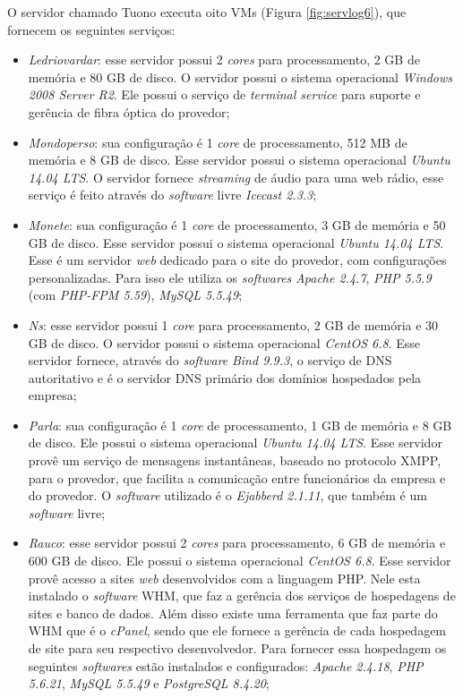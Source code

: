 O servidor chamado Tuono executa oito \ac{VM}s (Figura \ref{fig:servlog6}), que fornecem os seguintes serviços:
\begin{itemize}
 \item \textit{Ledriovardar}: esse servidor possui 2 \textit{cores} para processamento, 2 GB de memória e 80 GB de disco. O servidor possui 
 o sistema operacional \textit{Windows 2008 Server R2}. Ele possui o serviço de \textit{terminal service} para suporte e gerência de fibra 
 óptica do provedor;
 
 \item \textit{Mondoperso}: sua configuração é 1 \textit{core} de processamento, 512 MB de memória e 8 GB de disco. Esse servidor possui o 
 sistema operacional \textit{Ubuntu 14.04 \ac{LTS}}. O servidor fornece \textit{streaming} de áudio para uma web rádio, esse serviço é feito
 através do \textit{software} livre \textit{Icecast 2.3.3};
 
 \item \textit{Monete}: sua configuração é 1 \textit{core} de processamento, 3 GB de memória e 50 GB de disco. Esse servidor possui o 
 sistema operacional \textit{Ubuntu 14.04 \ac{LTS}}. Esse é um servidor \textit{web} dedicado para o site do provedor, com configurações
 personalizadas. Para isso ele utiliza os \textit{softwares} \textit{Apache 2.4.7}, \textit{\ac{PHP} 5.5.9} (com \textit{PHP-FPM 5.59}), 
 \textit{MySQL 5.5.49};
 
 \item \textit{Ns}: esse servidor possui 1 \textit{core} para processamento, 2 GB de memória e 30 GB de disco. O servidor possui 
 o sistema operacional \textit{CentOS 6.8}. Esse servidor fornece, através do \textit{software} \textit{Bind 9.9.3}, o serviço de \ac{DNS} 
 autoritativo e é o servidor \ac{DNS} primário dos domínios hospedados pela empresa;
 
 \item \textit{Parla}: sua configuração é 1 \textit{core} de processamento, 1 GB de memória e 8 GB de disco. Ele possui o sistema
 operacional \textit{Ubuntu 14.04 \ac{LTS}}. Esse servidor provê um serviço de mensagens instantâneas, baseado no protocolo \ac{XMPP}, para
 o provedor, que facilita a comunicação entre funcionários da empresa e do provedor. O \textit{software} utilizado é o \textit{Ejabberd 2.1.11},
 que também é um \textit{software} livre;
 
 \item \textit{Rauco}: esse servidor possui 2 \textit{cores} para processamento, 6 GB de memória e 600 GB de disco. Ele possui o sistema
 operacional \textit{CentOS 6.8}. Esse servidor provê acesso a sites \textit{web} desenvolvidos com a linguagem \ac{PHP}. Nele esta instalado o 
 \textit{software} \ac{WHM}, que faz a gerência dos serviços de hospedagens de sites e banco de dados. Além disso existe uma ferramenta que 
 faz parte do \ac{WHM} que é o \textit{cPanel}, sendo que ele fornece a gerência de cada hospedagem de site para seu respectivo desenvolvedor.
 Para fornecer essa hospedagem os seguintes \textit{softwares} estão instalados e configurados: \textit{Apache 2.4.18}, \textit{\ac{PHP} 5.6.21}, 
 \textit{MySQL 5.5.49} e \textit{PostgreSQL 8.4.20};
 

\end{itemize}
